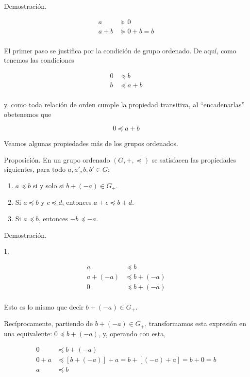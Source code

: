 Demostración.

\begin{align*}
  a &\succeq 0 \\
  a + b &\succeq 0 + b = b \\
\end{align*}

\noindent El primer paso se justifica por la condición de grupo ordenado. De
aquí, como tenemos las condiciones

\begin{align*}
  0 &\preceq b \\
  b &\preceq a + b \\
\end{align*}

\noindent y, como toda relación de orden cumple la propiedad transitiva, al
``encadenarlas'' obetenemos que

$$ 0 \preceq a + b $$

Veamos algunas propiedades más de los grupos ordenados.

Proposición. En un grupo ordenado $(G, +, \preceq)$ se satisfacen las
propiedades siguientes, para todo $a, a', b, b' \in G$:

\begin{enumerate}
  \item $a \preceq b$ si y solo si $b + ({-a}) \in G_+$.
  \item Si $a \preceq b$ y $c \preceq d$, entonces $a + c \preceq b + d$.
  \item Si $a \preceq b$, entonces ${-b} \preceq {-a}$.
\end{enumerate}

Demostración.

1.

\begin{align*}
  a &\preceq b \\
  a + ({-a}) &\preceq b + ({-a}) \\
  0 &\preceq b + ({-a}) \\
\end{align*}

\noindent Esto es lo mismo que decir $b + ({-a}) \in G_+$.

Recíprocamente, partiendo de $b + ({-a}) \in G_+$, transformamos esta
expresión en una equivalente: $0 \preceq b + ({-a})$, y, operando con esta,

\begin{align*}
  0 &\preceq b + ({-a}) \\
  0 + a &\preceq [b + ({-a})] + a = b + [({-a}) + a] = b + 0 = b \\
  a &\preceq b \\
\end{align*}

